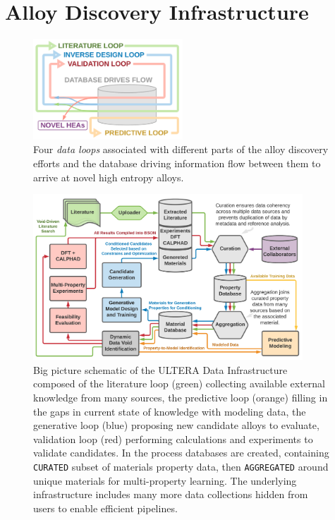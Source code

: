 \section{Alloy Discovery Infrastructure} \label{ultera:sec:infrastructure}

\todo

\begin{figure}[H]
    \centering
    \includegraphics[width=0.5\textwidth]{ultera/PersepctivePaper_DataFlow_V2.png}
    \caption{Four \emph{data loops} associated with different parts of the alloy discovery efforts and the database driving information flow between them to arrive at novel high entropy alloys.}
    \label{ultera:fig:dataloops}
\end{figure}

\begin{figure}[H]
    \centering
    \includegraphics[width=0.9\textwidth]{ultera/PersepctivePaper_Ecosystem_V6.png}
    \caption{Big picture schematic of the ULTERA Data Infrastructure composed of the literature loop (green) collecting available external knowledge from many sources, the predictive loop (orange) filling in the gaps in current state of knowledge with modeling data, the generative loop (blue) proposing new candidate alloys to evaluate, validation loop (red) performing calculations and experiments to validate candidates. In the process databases are created, containing \texttt{CURATED} subset of materials property data, then \texttt{AGGREGATED} around unique materials for multi-property learning. The underlying infrastructure includes many more data collections hidden from users to enable efficient pipelines.}
    \label{ultera:fig:dataschematic}
\end{figure}




